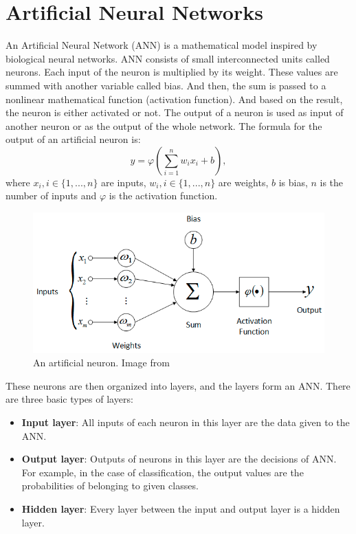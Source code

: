 \documentclass[thesis=B,english]{FITthesis}[2019/12/23]
\begin{document}
\section{Artificial Neural Networks}
An Artificial Neural Network (ANN) is a mathematical model inspired by biological neural networks. ANN consists of small interconnected units called neurons. Each input of the neuron is multiplied by its weight. These values are summed with another variable called bias. And then, the sum is passed to a nonlinear mathematical function (activation function). And based on the result, the neuron is either activated or not. The output of a neuron is used as input of another neuron or as the output of the whole network.
The formula for the output of an artificial neuron is:
\begin{equation}
    y =  \varphi \left( \sum_{i=1}^n w_{i} x_i  + b\right),
\end{equation}
where $x_i, i\in\{1, ..., n\}$ are inputs, $w_i, i\in\{1, ..., n\}$ are weights, $b$ is bias, $n$ is the number of inputs and $\varphi$ is the activation function.

\begin{figure}[ht]
		\includegraphics[scale=0.55]{images/artificial_neuron.png}
		\centering
		\caption{An artificial neuron. Image from \cite{oliveira_2017}}
\end{figure}

These neurons are then organized into layers, and the layers form an ANN. There are three basic types of layers:

\begin{itemize}
	\item \textbf{Input layer}: All inputs of each neuron in this layer are the data given to the ANN.
	\item \textbf{Output layer}: Outputs of neurons in this layer are the decisions of ANN. For example, in the case of classification, the output values are the probabilities of belonging to given classes.
	\item \textbf{Hidden layer}: Every layer between the input and output layer is a hidden layer.
\end{itemize}
\end{document}
